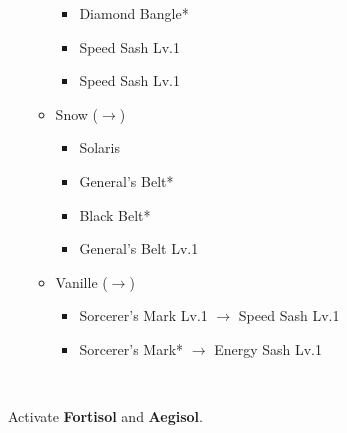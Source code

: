 \begin{menu}
\begin{itemize}
\begin{itemize}
				\begin{itemize}
					\item Diamond Bangle*
					\item Speed Sash Lv.1
					\item Speed Sash Lv.1
				\end{itemize}
			\item Snow ($\rightarrow$)
				\begin{itemize}
					\item Solaris
					\item General's Belt*
					\item Black Belt*
					\item General's Belt Lv.1
				\end{itemize}
			\item Vanille ($\rightarrow$)
				\begin{itemize}
					\item Sorcerer's Mark Lv.1 $\rightarrow$ Speed Sash Lv.1
					\item Sorcerer's Mark* $\rightarrow$ Energy Sash Lv.1
				\end{itemize}
		\end{itemize}
	\end{itemize}
\end{menu}

\renewcommand{\first}{[1] Cerberus (\com/\com/\com)}
\renewcommand{\second}{[2] Solidarity (\com/\sen/\med)}
\renewcommand{\third}{[3] Delta Attack (\com/\sen/\rav)}
\renewcommand{\fourth}{[4] Mystic Tower (\rav/\sen/\rav)}
\renewcommand{\fifth}{[5] Protection (\syn/\sen/\med)}
\renewcommand{\sixth}{[6] Tortoise (\sen/\sen/\sen)}
\vfill
\ 
\columnbreak

Activate \textbf{Fortisol} and \textbf{Aegisol}.

